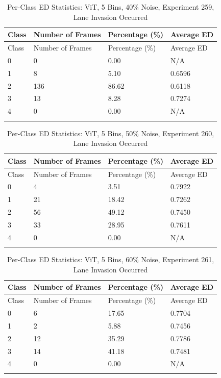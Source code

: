 
\begin{longtable}{@{}llll@{}}
\toprule
Class & Number of Frames & Percentage (\%) & Average ED \\
\midrule
\endfirsthead
\toprule
Class & Number of Frames & Percentage (\%) & Average ED \\
\midrule
\endhead
0 & 0 & 0.00 & N/A \\
1 & 8 & 5.10 & 0.6596 \\
2 & 136 & 86.62 & 0.6118 \\
3 & 13 & 8.28 & 0.7274 \\
4 & 0 & 0.00 & N/A \\
\bottomrule
\caption{Per-Class ED Statistics: ViT, 5 Bins, 40\% Noise, Experiment 259, Lane Invasion Occurred}
\label{tab:exp259_ViT_5bins_40noise}
\end{longtable}
        


\begin{longtable}{@{}llll@{}}
\toprule
Class & Number of Frames & Percentage (\%) & Average ED \\
\midrule
\endfirsthead
\toprule
Class & Number of Frames & Percentage (\%) & Average ED \\
\midrule
\endhead
0 & 4 & 3.51 & 0.7922 \\
1 & 21 & 18.42 & 0.7262 \\
2 & 56 & 49.12 & 0.7450 \\
3 & 33 & 28.95 & 0.7611 \\
4 & 0 & 0.00 & N/A \\
\bottomrule
\caption{Per-Class ED Statistics: ViT, 5 Bins, 50\% Noise, Experiment 260, Lane Invasion Occurred}
\label{tab:exp260_ViT_5bins_50noise}
\end{longtable}
        


\begin{longtable}{@{}llll@{}}
\toprule
Class & Number of Frames & Percentage (\%) & Average ED \\
\midrule
\endfirsthead
\toprule
Class & Number of Frames & Percentage (\%) & Average ED \\
\midrule
\endhead
0 & 6 & 17.65 & 0.7704 \\
1 & 2 & 5.88 & 0.7456 \\
2 & 12 & 35.29 & 0.7786 \\
3 & 14 & 41.18 & 0.7481 \\
4 & 0 & 0.00 & N/A \\
\bottomrule
\caption{Per-Class ED Statistics: ViT, 5 Bins, 60\% Noise, Experiment 261, Lane Invasion Occurred}
\label{tab:exp261_ViT_5bins_60noise}
\end{longtable}
        

